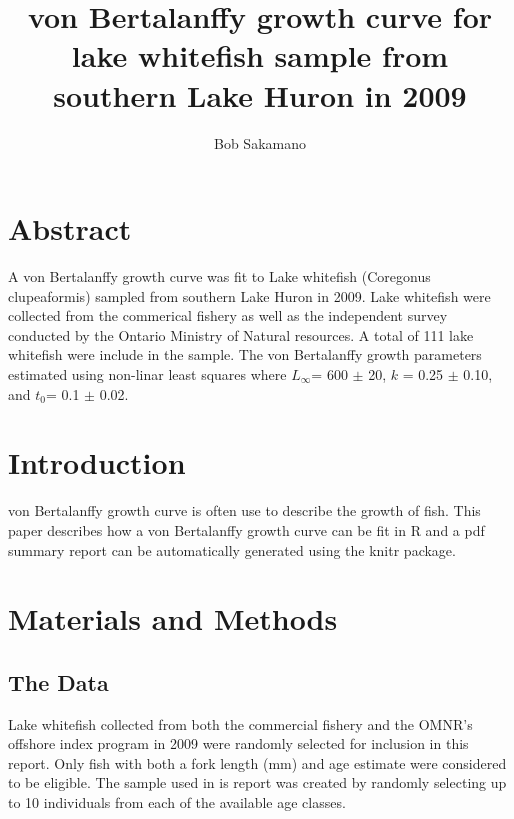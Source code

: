 \documentclass{article}
\begin{document}
\graphicspath{{figures/}}


\title{von Bertalanffy growth curve for lake whitefish sample from
       southern Lake Huron in 2009}

\author{Bob Sakamano}

\maketitle

\section*{Abstract}
\label{sec:abstract}

A von Bertalanffy growth curve was fit to Lake whitefish (Coregonus
clupeaformis) sampled from southern Lake Huron in 2009.  Lake
whitefish were collected from the commerical fishery as well as the
independent survey conducted by the Ontario Ministry of Natural
resources.  A total of 111 lake whitefish were include in the sample.
The von Bertalanffy growth parameters estimated using non-linar least
squares where $L_{\infty}$= 600 $\pm$ 20, $k$ = 0.25 $\pm$ 0.10, and $t_0$= 0.1
$\pm$ 0.02.


\section*{Introduction}
\label{sec:introduction}

von Bertalanffy growth curve is often use to describe the growth of
fish.  This paper describes how a von Bertalanffy growth curve can be
fit in R and a pdf summary report can be automatically generated using
the knitr package.

\section*{Materials and Methods}
\label{sec:Materials_and_Methods}

\subsection*{The Data}
\label{sub:the_data}

Lake whitefish collected from both the commercial fishery and the
OMNR's offshore index program in 2009 were randomly selected for
inclusion in this report.  Only fish with both a fork length (mm) and
age estimate were considered to be eligible.  The sample used in is
report was created by randomly selecting up to 10 individuals from each
of the available age classes.
\end{document}
